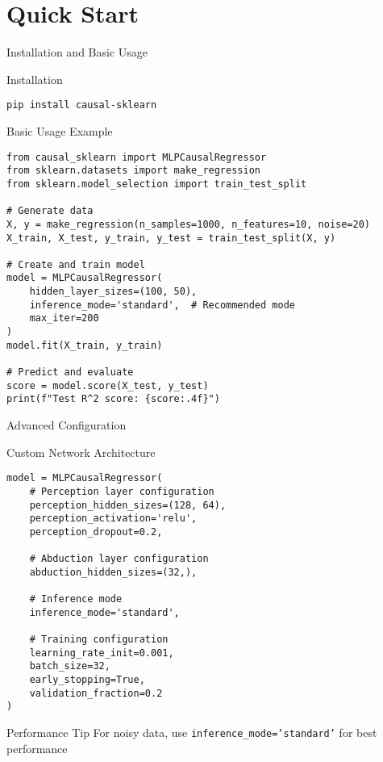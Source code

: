 \documentclass[aspectratio=169,10pt]{beamer}
\begin{document}
\section{Quick Start}

\begin{frame}[fragile]{Installation and Basic Usage}
\begin{block}{Installation}
\begin{lstlisting}
pip install causal-sklearn
\end{lstlisting}
\end{block}

\begin{block}{Basic Usage Example}
\begin{lstlisting}
from causal_sklearn import MLPCausalRegressor
from sklearn.datasets import make_regression
from sklearn.model_selection import train_test_split

# Generate data
X, y = make_regression(n_samples=1000, n_features=10, noise=20)
X_train, X_test, y_train, y_test = train_test_split(X, y)

# Create and train model
model = MLPCausalRegressor(
    hidden_layer_sizes=(100, 50),
    inference_mode='standard',  # Recommended mode
    max_iter=200
)
model.fit(X_train, y_train)

# Predict and evaluate
score = model.score(X_test, y_test)
print(f"Test R^2 score: {score:.4f}")
\end{lstlisting}
\end{block}
\end{frame}

\begin{frame}[fragile]{Advanced Configuration}
\begin{block}{Custom Network Architecture}
\begin{lstlisting}
model = MLPCausalRegressor(
    # Perception layer configuration
    perception_hidden_sizes=(128, 64),
    perception_activation='relu',
    perception_dropout=0.2,
    
    # Abduction layer configuration
    abduction_hidden_sizes=(32,),
    
    # Inference mode
    inference_mode='standard',
    
    # Training configuration
    learning_rate_init=0.001,
    batch_size=32,
    early_stopping=True,
    validation_fraction=0.2
)
\end{lstlisting}
\end{block}

\begin{alertblock}{Performance Tip}
For noisy data, use \texttt{inference\_mode='standard'} for best performance
\end{alertblock}
\end{frame}
\end{document}
